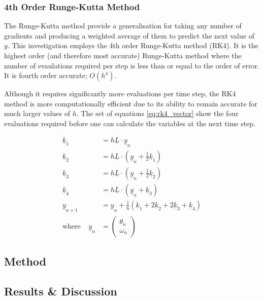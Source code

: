 \documentclass[11pt]{article}
\begin{document}
\subsubsection*{4th Order Runge-Kutta Method}
The Runge-Kutta method provide a generalisation for taking any number of gradients and producing a weighted average of them to predict the next value of $y$. This investigation employs the 4th order Runge-Kutta method (RK4). It is the highest order (and therefore most accurate) Runge-Kutta method where the number of evaulations required per step is less than or equal to the order of error. It is fourth order accurate; $O(h^4)$.

Although it requires significantly more evaluations per time step, the RK4 method is more computationally efficient due to its ability to remain accurate for much larger values of $h$. The set of equations \ref{eq:rk4_vector} show the four evaluations required before one can calculate the variables at the next time step.

\begin{equation} \label{eq:rk4_vector}
\begin{split}
\underline{k}_{1} &= h \underline{L} \cdot \underline{y}_{n}  \\
\underline{k}_{2} &= h \underline{L} \cdot ( \underline{y}_{n} + \frac{1}{2} \underline{k}_{1}) \\
\underline{k}_{3} &= h \underline{L} \cdot ( \underline{y}_{n} + \frac{1}{2} \underline{k}_{2}) \\
\underline{k}_{4} &= h \underline{L} \cdot ( \underline{y}_{n} + \underline{k}_{3}) \\
\underline{y}_{n+1} &= \underline{y}_{n} + \frac{1}{6} ( \underline{k}_{1} + 2\underline{k}_{2} + 2\underline{k}_{3} + \underline{k}_{4}) \\
\text{where} \;\;\;\; \underline{y}_{n} &= \begin{pmatrix}\theta_{n} \\ \omega_{n} \end{pmatrix}
\end{split}
\end{equation}

\subsection{Method}
\subsection{Results \& Discussion}
\end{document}
